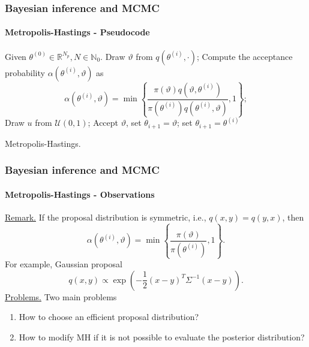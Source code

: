 \documentclass{beamer}
\newcommand{\N}{\mathbb{N}}
\newcommand{\R}{\mathbb{R}}
\begin{document}
\begin{frame}
	\frametitle{Bayesian inference and MCMC}
	\framesubtitle{Metropolis-Hastings - Pseudocode}
	\begin{algorithm}[H]	
		\begin{algorithmic}
			\STATE Given $\theta^{(0)} \in \R^{N_p}, N \in \N_0$.
			\STATE Draw $\vartheta$ from $q(\theta^{(i)}, \cdot)$;
			\STATE Compute the acceptance probability $\alpha(\theta^{(i)}, \vartheta)$ as $$\alpha(\theta^{(i)}, \vartheta) = \min\left\{\frac{\pi(\vartheta)q(\vartheta, \theta^{(i)})}{\pi(\theta^{(i)})q(\theta^{(i)}, \vartheta)}, 1\right\};$$
			\STATE Draw $u$ from $\mathcal{U}(0, 1)$;
			\STATE Accept $\vartheta$, set $\theta_{i+1} = \vartheta$; 
			\ELSE
			\STATE set $\theta_{i+1} = \theta^{(i)}$
			\ENDIF
			\ENDFOR
		\end{algorithmic}
		\caption{Metropolis-Hastings.}
	\end{algorithm}
\end{frame}

\begin{frame}
	\frametitle{Bayesian inference and MCMC}
	\framesubtitle{Metropolis-Hastings - Observations}
	
	\underline{Remark.} If the proposal distribution is symmetric, i.e., $q(x,y) = q(y,x)$, then 
	\begin{equation*}
		\alpha(\theta^{(i)}, \vartheta) = \min\left\{\frac{\pi(\vartheta)}{\pi(\theta^{(i)})}, 1\right\}.
	\end{equation*}
	For example, Gaussian proposal \cite{KaS05}
	\begin{equation*}
		q(x, y) \propto \exp(-\frac{1}{2}(x - y)^T\Sigma^{-1}(x - y)).
	\end{equation*}
	\underline{Problems.} Two main problems
	\begin{enumerate}
		\item How to choose an efficient proposal distribution?
		\item How to modify MH if it is not possible to evaluate the posterior distribution?
	\end{enumerate}
\end{frame}
\end{document}
